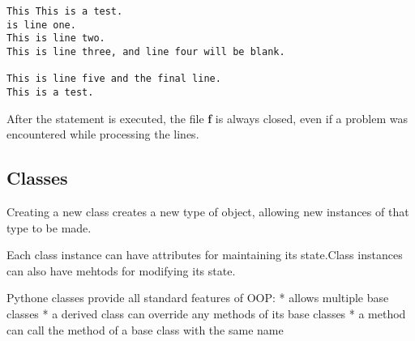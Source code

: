 \documentclass[11pt]{article}
\begin{document}
    \begin{Verbatim}[commandchars=\\\{\}]
This This is a test.
is line one.
This is line two.
This is line three, and line four will be blank.

This is line five and the final line.
This is a test.

    \end{Verbatim}

    After the statement is executed, the file \textbf{f} is always closed,
even if a problem was encountered while processing the lines.

    \subsection{Classes}\label{classes}

Creating a new class creates a new type of object, allowing new
instances of that type to be made.

Each class instance can have attributes for maintaining its state.Class
instances can also have mehtods for modifying its state.

Pythone classes provide all standard features of OOP: * allows multiple
base classes * a derived class can override any methods of its base
classes * a method can call the method of a base class with the same
name


    
    
    
    
\end{document}
